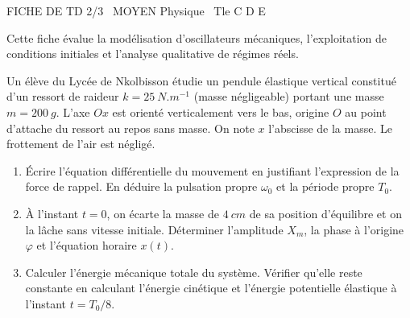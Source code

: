 \documentclass[11pt]{article}
\begin{document}
\begin{tcolorbox}[enhanced,colback=popink,colframe=popink,arc=10pt,boxrule=0pt,left=12pt,right=12pt,top=9pt,bottom=9pt]
{\color{white}\popxbold\small FICHE DE TD 2/3 \textbullet\ MOYEN \hfill Physique \textbullet\ Tle C D E\par}
\end{tcolorbox}
\vspace{4pt}
Cette fiche évalue la modélisation d'oscillateurs mécaniques, l'exploitation de conditions initiales et l'analyse qualitative de régimes réels.

\begin{exercice}
Un élève du Lycée de Nkolbisson étudie un pendule élastique vertical constitué d'un ressort de raideur $k = \SI{25}{N.m^{-1}}$ (masse négligeable) portant une masse $m = \SI{200}{g}$. L'axe $Ox$ est orienté verticalement vers le bas, origine $O$ au point d'attache du ressort au repos sans masse. On note $x$ l'abscisse de la masse. Le frottement de l'air est négligé.
\begin{enumerate}
    \item Écrire l'équation différentielle du mouvement en justifiant l'expression de la force de rappel. En déduire la pulsation propre $\omega_0$ et la période propre $T_0$.
    \item À l'instant $t=0$, on écarte la masse de $\SI{4}{cm}$ de sa position d'équilibre et on la lâche sans vitesse initiale. Déterminer l'amplitude $X_m$, la phase à l'origine $\varphi$ et l'équation horaire $x(t)$.
    \item Calculer l'énergie mécanique totale du système. Vérifier qu'elle reste constante en calculant l'énergie cinétique et l'énergie potentielle élastique à l'instant $t = T_0/8$.
\end{enumerate}
\end{exercice}
\end{document}
